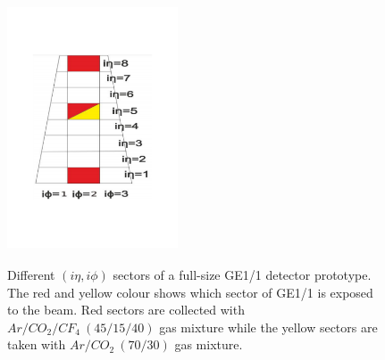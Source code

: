 \begin{figure}[!htbp]
\centering
\includegraphics[width=0.45\textwidth,height=8cm,angle=0]{figures/GEM/GE11.pdf}
\caption{Different $(i\eta,i\phi)$ sectors of a full-size GE1/1 detector prototype. The red and yellow colour shows which sector of GE1/1 is exposed to the beam. Red sectors are collected with $Ar/CO_2/CF_4~(45/15/40)$ gas mixture while the yellow sectors are taken with $Ar/CO_2~(70/30)$ gas mixture.}
\label{GE1/1}
\end{figure}
